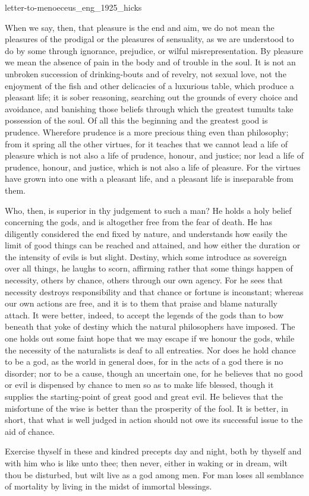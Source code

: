 \documentclass{stex}
\begin{document}
\begin{smodule}{letter-to-menoeceus_eng_1925_hicks}
\begin{sparagraph}[id=letter-to-menoeceus,name=Letter to Menoeceus]
  When we say, then, that pleasure is the end and aim, we do not mean the pleasures of the prodigal or the pleasures of sensuality, as we are understood to do by some through ignorance, prejudice, or wilful misrepresentation.
  By pleasure we mean the absence of pain in the body and of trouble in the soul.
  It is not an unbroken succession of drinking-bouts and of revelry, not sexual love, not the enjoyment of the fish and other delicacies of a luxurious table, which produce a pleasant life; it is sober reasoning, searching out the grounds of every choice and avoidance, and banishing those beliefs through which the greatest tumults take possession of the soul.
  Of all this the beginning and the greatest good is prudence.
  Wherefore prudence is a more precious thing even than philosophy; from it spring all the other virtues, for it teaches that we cannot lead a life of pleasure which is not also a life of prudence, honour, and justice; nor lead a life of prudence, honour, and justice, which is not also a life of pleasure.
  For the virtues have grown into one with a pleasant life, and a pleasant life is inseparable from them.

  Who, then, is superior in thy judgement to such a man? He holds a holy belief concerning the gods, and is altogether free from the fear of death.
  He has diligently considered the end fixed by nature, and understands how easily the limit of good things can be reached and attained, and how either the duration or the intensity of evils is but slight.
  Destiny, which some introduce as sovereign over all things, he laughs to scorn, affirming rather that some things happen of necessity, others by chance, others through our own agency.
  For he sees that necessity destroys responsibility and that chance or fortune is inconstant; whereas our own actions are free, and it is to them that praise and blame naturally attach.
  It were better, indeed, to accept the legends of the gods than to bow beneath that yoke of destiny which the natural philosophers have imposed.
  The one holds out some faint hope that we may escape if we honour the gods, while the necessity of the naturalists is deaf to all entreaties.
  Nor does he hold chance to be a god, as the world in general does, for in the acts of a god there is no disorder; nor to be a cause, though an uncertain one, for he believes that no good or evil is dispensed by chance to men so as to make life blessed, though it supplies the starting-point of great good and great evil.
  He believes that the misfortune of the wise is better than the prosperity of the fool.
  It is better, in short, that what is well judged in action should not owe its successful issue to the aid of chance.

  Exercise thyself in these and kindred precepts day and night, both by thyself and with him who is like unto thee; then never, either in waking or in dream, wilt thou be disturbed, but wilt live as a god among men.
  For man loses all semblance of mortality by living in the midst of immortal blessings.
\end{sparagraph}
\end{smodule}
\end{document}
